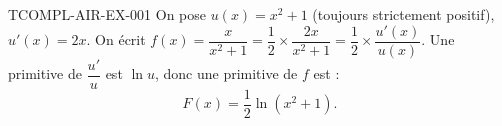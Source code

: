 \begin{corrige}{TCOMPL-AIR-EX-001}
On pose $u(x) = x^2+1$ (toujours strictement positif), $u'(x)=2x$. On écrit $f(x) = \dfrac{x}{x^2+1} = \dfrac{1}{2}\times\dfrac{2x}{x^2+1} = \dfrac{1}{2}\times\dfrac{u'(x)}{u(x)}$. Une primitive de $\dfrac{u'}{u}$ est $\ln u$, donc une primitive de $f$ est :
\[
  F(x) = \frac{1}{2}\ln(x^2+1).
\]
\end{corrige}
